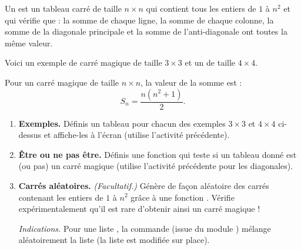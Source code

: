 \documentclass[11pt,class=report,crop=false]{standalone}
\begin{document}

\begin{activite}




Un  est un tableau carré de taille $n\times n$ qui contient tous les entiers de $1$ à $n^2$ et qui vérifie que :
la somme de chaque ligne, la somme de chaque colonne, la somme de la diagonale principale et la somme de l'anti-diagonale ont toutes la même valeur.

Voici un exemple de carré magique de taille $3\times 3$ et un de taille $4\times 4$.





Pour un carré magique de taille $n \times n$, la valeur de la somme est :
$$S_n = \frac{n(n^2+1)}{2}.$$



\begin{enumerate}
  \item \textbf{Exemples.} Définis un tableau pour chacun des exemples $3 \times 3$ et $4 \times 4$ ci-dessus et affiche-les à l'écran (utilise l'activité précédente).
  
  \item \textbf{Être ou ne pas être.} Définis une fonction  qui teste si un tableau donné est (ou pas) un carré magique (utilise l'activité précédente pour les diagonales).
  
  \item \textbf{Carrés aléatoires.} \emph{(Facultatif.)} Génère de façon aléatoire des carrés contenant les entiers de $1$ à $n^2$ grâce à une fonction . Vérifie expérimentalement qu'il est rare d'obtenir ainsi un carré magique ! 

  \emph{Indications.} Pour une liste , la commande  (issue du module ) mélange aléatoirement la liste (la liste est modifiée sur place). 
 

\end{enumerate}
\end{activite}
\end{document}

